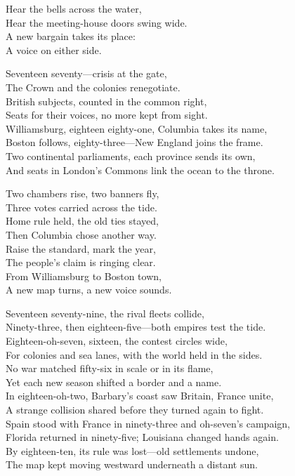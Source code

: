 \begin{lyrics}
Hear the bells across the water,\\
Hear the meeting-house doors swing wide.\\
A new bargain takes its place:\\
A voice on either side.

Seventeen seventy—crisis at the gate,\\
The Crown and the colonies renegotiate.\\
British subjects, counted in the common right,\\
Seats for their voices, no more kept from sight.\\
Williamsburg, eighteen eighty-one, Columbia takes its name,\\
Boston follows, eighty-three—New England joins the frame.\\
Two continental parliaments, each province sends its own,\\
And seats in London’s Commons link the ocean to the throne.

Two chambers rise, two banners fly,\\
Three votes carried across the tide.\\
Home rule held, the old ties stayed,\\
Then Columbia chose another way.\\
Raise the standard, mark the year,\\
The people’s claim is ringing clear.\\
From Williamsburg to Boston town,\\
A new map turns, a new voice sounds.

Seventeen seventy-nine, the rival fleets collide,\\
Ninety-three, then eighteen-five—both empires test the tide.\\
Eighteen-oh-seven, sixteen, the contest circles wide,\\
For colonies and sea lanes, with the world held in the sides.\\
No war matched fifty-six in scale or in its flame,\\
Yet each new season shifted a border and a name.\\
In eighteen-oh-two, Barbary’s coast saw Britain, France unite,\\
A strange collision shared before they turned again to fight.\\
Spain stood with France in ninety-three and oh-seven’s campaign,\\
Florida returned in ninety-five; Louisiana changed hands again.\\
By eighteen-ten, its rule was lost—old settlements undone,\\
The map kept moving westward underneath a distant sun.


\end{lyrics}

